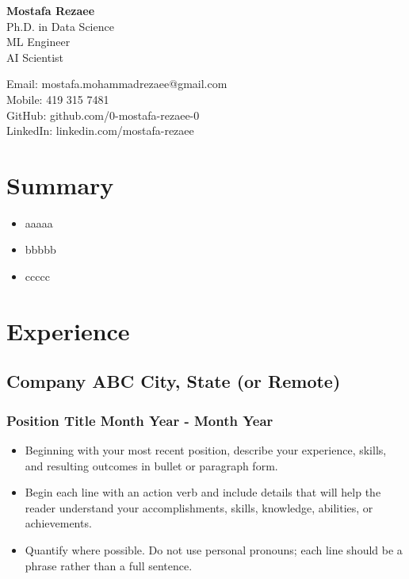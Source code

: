 \documentclass[11pt]{article} %
\begin{document}
\begin{center}
	\begin{minipage}{0.45\textwidth}
		{\Huge\bfseries
			Mostafa Rezaee  %
		} \\ \medskip
		Ph.D. in Data Science \\ %
		ML Engineer \\
		AI Scientist
	\end{minipage} \hfill
	\begin{minipage}{0.48\textwidth}
		Email: mostafa.mohammadrezaee@gmail.com \\
		Mobile: 419 315 7481 \\
		GitHub: github.com/0-mostafa-rezaee-0 \\
		LinkedIn: linkedin.com/mostafa-rezaee 
	\end{minipage}
\end{center}

\section{Summary}
\begin{itemize}
	\item aaaaa
	\item bbbbb
	\item ccccc
\end{itemize}

\section{Experience}
\subsection{Company ABC \hfill City, State (or Remote)}
\subsubsection{Position Title \hfill  Month Year - Month Year}
\begin{itemize}
	\item Beginning with your most recent position, describe your experience, skills, and resulting outcomes in bullet or paragraph form.
	\item Begin each line with an action verb and include details that will help the reader understand your accomplishments, skills, knowledge, abilities, or achievements.
	\item Quantify where possible. Do not use personal pronouns; each line should be a phrase rather than a full sentence.
\end{itemize}
\end{document}
